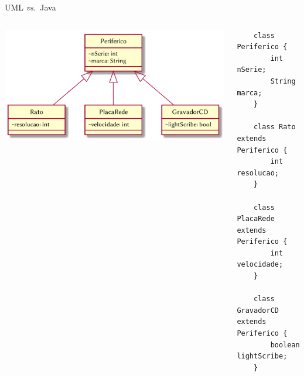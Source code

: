 \documentclass[portuguese, aspectratio=169, xcolor=table]{beamer}
\begin{document}
\begin{frame}[fragile]{UML \textit{vs.}\ Java}
\begin{columns}
\begin{center}
    \includegraphics[width=\linewidth]{./uml_diagrams/class8}
\end{center}
\scriptsize
\begin{verbatim}
    class Periferico {
        int nSerie;
        String marca;
    }
    
    class Rato extends Periferico {
        int resolucao;
    }
    
    class PlacaRede extends Periferico {
        int velocidade;
    }
    
    class GravadorCD extends Periferico {
        boolean lightScribe;
    }
\end{verbatim}
\end{columns}
\end{frame}
\end{document}
